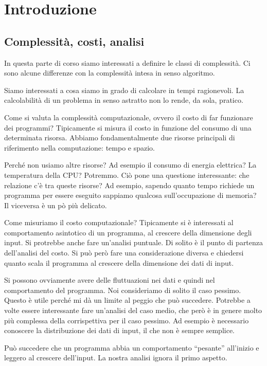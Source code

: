 \chapter{Introduzione}

\section{Complessità, costi, analisi}

In questa parte di corso siamo interessati a definire le classi di complessità. Ci sono alcune
differenze con la complessità intesa in senso algoritmo.

Siamo interessati a cosa siamo in grado di calcolare in tempi ragionevoli. La calcolabilità di un
problema in senso astratto non lo rende, da sola, pratico.

Come si valuta la complessità computazionale, ovvero il costo di far funzionare dei programmi?
Tipicamente si misura il costo in funzione del consumo di una determinata risorsa. Abbiamo
fondamentalmente due risorse principali di riferimento nella computazione: tempo e spazio.

Perché non usiamo altre risorse? Ad esempio il consumo di energia elettrica? La temperatura della
CPU? Potremmo. Ciò pone una questione interessante: che relazione c'è tra queste risorse? Ad
esempio, sapendo quanto tempo richiede un programma per essere eseguito sappiamo qualcosa
sull'occupazione di memoria? Il viceversa è un pò più delicato.

Come misuriamo il costo computazionale? Tipicamente si è interessati al comportamento asintotico di
un programma, al crescere della dimensione degli input. Si protrebbe anche fare un'analisi puntuale.
Di solito è il punto di partenza dell'analisi del costo. Si può però fare una considerazione
diversa e chiedersi quanto scala il programma al crescere della dimensione dei dati di input.

Si possono ovviamente avere delle fluttuazioni nei dati e quindi nel comportamento del programma.
Noi consideriamo di solito il caso pessimo. Questo è utile perché mi dà un limite al peggio che
può succedere. Potrebbe a volte essere interessante fare un'analisi del caso medio, che però è in
genere molto più complessa della corrispettiva per il caso pessimo. Ad esempio è necessario
conoscere la distribuzione dei dati di input, il che non è sempre semplice.

Può succedere che un programma abbia un comportamento ``pesante'' all'inizio e leggero al crescere
dell'input. La nostra analisi ignora il primo aspetto.

